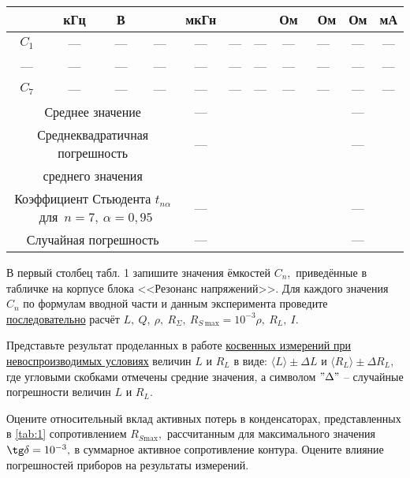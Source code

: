 \begin{lab:task}
\begin{center}
\begin{table}[tb!]
\begin{center}
\begin{tabular}{|c|c|c|c|c|c|c|c|c|c|c|}
		                     & кГц & В & & мкГн &  &  & Ом & ~Ом & Ом & мА \\
		                    \hline
		                    $C_1$ & {---} & --- & --- & --- & --- & --- & --- & --- & --- & --- \\
		                    \hline
		                    --- & --- & --- & --- & --- & --- & --- & --- & --- & ---& ---\\
		                    \hline
		                    $C_7$& --- & --- & --- & --- & --- & --- & ---& --- &--- &---\\
		                    \hline
		                    \multicolumn{4}{|c|}{ Среднее значение} & --- & & & & &---& \\
		                    \hline
		                    \multicolumn{4}{|c|}{ Среднеквадратичная погрешность } & ---& & & & &---& \\\multicolumn{4}{|c|}{  среднего значения} &  & & & & && \\
		                    \hline
		                    \multicolumn{4}{|c|}{ Коэффициент Стьюдента $t_{n\alpha}$~для~$n=7,~\alpha=0,95$} & ---& & & & &---&\\
		                    \hline
		                    \multicolumn{4}{|c|}{ Случайная погрешность } & ---& & & & &---&\\
		
		                    \hline
		                \end{tabular}
		            \end{center}
		        \end{table}
		    \end{center}
		
		\par
		В первый столбец табл. 1 запишите значения ёмкостей $C_n,$ приведённые в табличке на корпусе блока <<Резонанс напряжений>>. Для каждого значения $C_n$ по фор\-мулам вводной части и данным эксперимента проведите \underline{последовательно} расчёт $L,~Q,~\rho,~R_{\Sigma},~R_{S~\text{max}}=10^{-3}\rho,~R_L,~I.$
		\par
		Представьте результат проделанных в работе \underline{косвенных измерений при невоспроиз\-водимых условиях} величин $L$ и $R_L$ в виде: $\langle L\rangle\pm\Delta L$ и $\langle R_L\rangle\pm\Delta R_L,$ где угловыми скобка\-ми отмечены средние значения, а символом $"\Delta"$ – случайные погрешности величин $L$ и $R_L.$
		\par
		Оцените относительный вклад активных потерь в конденсаторах, представленных в \eqref{tab:1} сопротивлением $R_{S\text{max}},$ рассчитанным для максимального значения $\tg\delta=10^{-3},$ в суммарное активное сопротивление контура. Оцените влияние погрешностей приборов на результаты измерений.


\end{lab:task}
